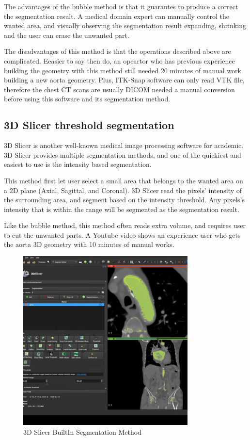The advantages of the bubble method is that it guarantes to produce a correct the segmentation result. A medical domain expert can manually control the wanted area, and visually observing the segmentation result expanding, shrinking and the user can erase the unwanted part.

The disadvantages of this method is that the operations described above are complicated. Eeasier to say then do, an opeartor who has previous experience building the geometry with this method still needed 20 minutes of manual work building a new aorta geometry. Plus, ITK-Snap software can only read VTK file, therefore the chest CT scans are usually DICOM needed a manual conversion before using this software and its segmentation method.

\subsection{3D Slicer threshold segmentation}
3D Slicer is another well-known medical image processing software for academic. 3D Slicer provides multiple segmentation methods, and one of the quickiest and easiest to use is the intensity based segmentation.

This method first let user select a small area that belongs to the wanted area on a 2D plane (Axial, Sagittal, and Coronal). 3D Slicer read the pixels' intensity of the surrounding area, and segment based on the intensity threshold. Any pixels's intensity that is within the range will be segmented as the segmentation result. 

Like the bubble method, this method often reads extra volume, and requires user to cut the unwanted parts. A Youtube video shows an experience user who gets the aorta 3D geometry with 10 minutes of manual works.

\begin{figure}[H]
    \centering
    \includegraphics[width=0.8\textwidth]{figures/Sample/3D-Slicer-Segmentation.png}
    \caption[3D Slicer BuiltIn Segmentation UI]{3D Slicer BuiltIn Segmentation Method}
    \label{fig_3D_Seg_Builtin}
\end{figure}

